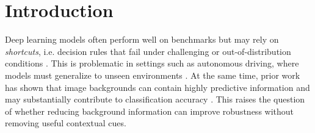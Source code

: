 \documentclass[sigconf, nonacm]{acmart}
\begin{document}
\section{Introduction}
%

Deep learning models often perform well on benchmarks but may rely on \textit{shortcuts}, i.e. decision rules that fail under challenging or out-of-distribution conditions \cite{geirhos2020shortcut}. This is problematic in settings such as autonomous driving, where models must generalize to unseen environments \cite{Beery_2018_RecogTerra}.
At the same time, prior work has shown that 
image backgrounds can contain highly predictive information and may substantially contribute to classification accuracy \cite{xiao2021noise}. This raises the question of whether reducing background information can improve robustness without removing useful contextual cues. 
\end{document}
